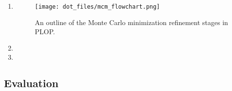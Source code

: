 
\begin{enumerate}
\item 
\begin{figure}[h]
\centering
\texttt{[image: dot\_files/mcm\_flowchart.png]}
\caption{An outline of the Monte Carlo minimization refinement stages in PLOP.}
\label{fig:mcm_flowchart}
\end{figure}
\item 
\item 
\end{enumerate}

\subsection{Evaluation}
\label{subsection:p450/evaluation}

